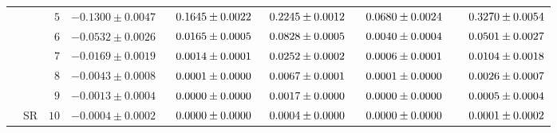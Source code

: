 \begin{table}[htbp]
{\begin{tabular}{ccrrrrrr}
                                                                                  &                         & \cellcolor{gray!10}$5$  & \cellcolor{gray!10}${-}0.1300\pm0.0047$              & \cellcolor{gray!10}$\hdneg0.1645\pm0.0022$           & \cellcolor{gray!10}$\hddig0.2245\pm0.0012$           & \cellcolor{gray!10}$\hdneg0.0680\pm0.0024$           & \cellcolor{gray!10}$\hdneg\hddig0.3270\pm0.0054$           \\
                                                                                  &                         & \cellcolor{gray!10}$6$  & \cellcolor{gray!10}${-}0.0532\pm0.0026$              & \cellcolor{gray!10}$\hdneg0.0165\pm0.0005$           & \cellcolor{gray!10}$\hddig0.0828\pm0.0005$           & \cellcolor{gray!10}$\hdneg0.0040\pm0.0004$           & \cellcolor{gray!10}$\hdneg\hddig0.0501\pm0.0027$           \\
                                                                                  &                         & \cellcolor{gray!10}$7$  & \cellcolor{gray!10}${-}0.0169\pm0.0019$              & \cellcolor{gray!10}$\hdneg0.0014\pm0.0001$           & \cellcolor{gray!10}$\hddig0.0252\pm0.0002$           & \cellcolor{gray!10}$\hdneg0.0006\pm0.0001$           & \cellcolor{gray!10}$\hdneg\hddig0.0104\pm0.0018$           \\
                                                                                  &                         & \cellcolor{gray!10}$8$  & \cellcolor{gray!10}${-}0.0043\pm0.0008$              & \cellcolor{gray!10}$\hdneg0.0001\pm0.0000$           & \cellcolor{gray!10}$\hddig0.0067\pm0.0001$           & \cellcolor{gray!10}$\hdneg0.0001\pm0.0000$           & \cellcolor{gray!10}$\hdneg\hddig0.0026\pm0.0007$           \\
                                                                                  &                         & \cellcolor{gray!10}$9$  & \cellcolor{gray!10}${-}0.0013\pm0.0004$              & \cellcolor{gray!10}$\hdneg0.0000\pm0.0000$           & \cellcolor{gray!10}$\hddig0.0017\pm0.0000$           & \cellcolor{gray!10}$\hdneg0.0000\pm0.0000$           & \cellcolor{gray!10}$\hdneg\hddig0.0005\pm0.0004$           \\
                                                                                  & \multirow{-7}{*}{SR}    & \cellcolor{gray!10}$10$ & \cellcolor{gray!10}${-}0.0004\pm0.0002$              & \cellcolor{gray!10}$\hdneg0.0000\pm0.0000$           & \cellcolor{gray!10}$\hddig0.0004\pm0.0000$           & \cellcolor{gray!10}$\hdneg0.0000\pm0.0000$           & \cellcolor{gray!10}$\hdneg\hddig0.0001\pm0.0002$           \\

\end{tabular}}
\end{table}
